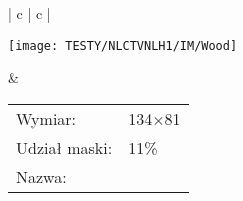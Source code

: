 \documentclass[12pt, twoside, openany]{report}
\theoremstyle{definition}
\begin{document}
\begin{longtable}[h!]{| c | c |}
    \begin{minipage}{.65\textwidth}
    \vspace{0.2cm}
    \centering
    \texttt{[image: TESTY/NLCTVNLH1/IM/Wood]}
    \vspace{0.2cm}
    \end{minipage}
    &
    \begin{minipage}{.35\textwidth}
    \begin{tabular}{l l}
	Wymiar: & 134$\times$81 \\
	Udział maski: & 11\% \\
	Nazwa: & \Wood
	\end{tabular}
    \end{minipage} \\ \hline
  \caption{Dodatkowa grupa obrazów testowych dla nielokalnego modelu $NLCTV$.}
  \label{NLCTVVSNLHIIM}
\end{longtable}
\end{document}
